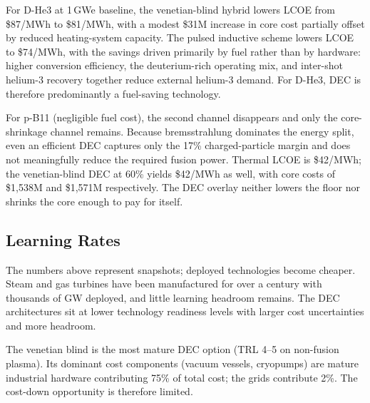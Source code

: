 \documentclass{article}
\begin{document}
For D-He3 at 1\,GWe baseline, the venetian-blind hybrid lowers
LCOE from \$87/MWh to \$81/MWh, with a modest \$31M
increase in core cost partially offset by reduced heating-system
capacity. The pulsed inductive scheme lowers LCOE to \$74/MWh,
with the savings driven primarily by fuel rather than by hardware:
higher conversion efficiency, the deuterium-rich operating mix, and
inter-shot helium-3 recovery together reduce external helium-3
demand. For D-He3, DEC is therefore predominantly a fuel-saving
technology.

For p-B11 (negligible fuel cost), the second channel disappears
and only the core-shrinkage channel remains. Because bremsstrahlung
dominates the energy split, even an efficient DEC captures only the
17\% charged-particle margin and does not meaningfully reduce the
required fusion power. Thermal LCOE is \$42/MWh; the
venetian-blind DEC at 60\% yields \$42/MWh as well, with core
costs of \$1{,}538M and \$1{,}571M respectively. The DEC overlay
neither lowers the floor nor shrinks the core enough to pay for
itself.

\subsection{Learning Rates}
\label{sec:learning}

The numbers above represent snapshots; deployed technologies become
cheaper. Steam and gas turbines have been manufactured for over a
century with thousands of GW deployed, and little learning headroom
remains. The DEC architectures sit at lower technology readiness
levels with larger cost uncertainties and more headroom.

The venetian blind is the most mature DEC option (TRL 4--5 on
non-fusion plasma). Its dominant cost components (vacuum vessels,
cryopumps) are mature industrial hardware contributing 75\% of
total cost; the grids contribute 2\%. The cost-down
opportunity is therefore limited.
\end{document}
